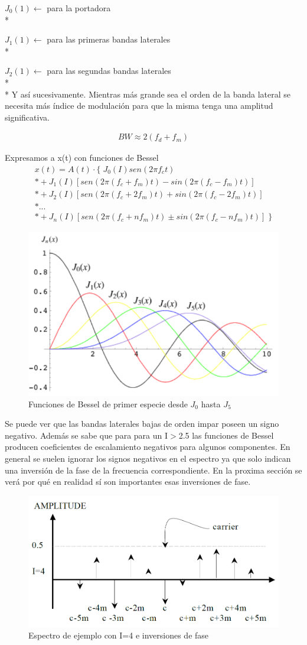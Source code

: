 \documentclass[assd_tp2_main.tex]{subfiles}
\begin{document}
$J_{0}(1)\longleftarrow$  para la portadora \\*

$J_{1}(1)\longleftarrow$  para las primeras bandas laterales \\*

$J_{2}(1)\longleftarrow$  para las segundas bandas laterales \\*
\\*
Y así sucesivamente.
Mientras más grande sea el orden de la banda lateral se necesita más índice de modulación para que la misma tenga una amplitud significativa.

\begin{eqnarray*}
\displaystyle BW \approx 2(f_d+f_m)
\end{eqnarray*}

Expresamos a x(t) con funciones de Bessel
\begin{eqnarray*}
\textstyle x(t)=A(t)\cdot \{ \; J_{0}(I)sen(2\pi f_c t) \\*
				+J_1(I)[sen(2\pi(f_c+f_m)t) - sin(2\pi(f_c-f_m)t)] \\*
				+J_2(I)[sen(2\pi(f_c+2f_m)t) + sin(2\pi(f_c-2f_m)t)] \\*
				... \\*
				+J_n(I)[sen(2\pi(f_c+n f_m)t) \pm sin(2\pi(f_c-n f_m)t)] \; \}
\end{eqnarray*}

\begin{figure}[H]
\centering
\includegraphics[width=0.4\linewidth]{graficos/EJ4/Bessel.png}
\caption{Funciones de Bessel de primer especie desde $J_0$ hasta $J_5$ }
\label{fig:Bessel}
\end{figure}

Se puede ver que las bandas laterales bajas de orden impar poseen un signo negativo. Además se sabe que para para un I$>$2.5
las funciones de Bessel producen coeficientes de escalamiento negativos para algunos componentes.
En general se suelen ignorar los signos negativos en el espectro ya que solo indican una inversión de la fase de la frecuencia correspondiente. En la proxima sección se verá por qué en realidad sí son importantes esas inversiones de fase.
\begin{figure}[H]
\centering
\includegraphics[width=0.4\linewidth]{graficos/EJ4/signos.png}
\caption{Espectro de ejemplo con I=4 e inversiones de fase}
\label{fig:signos}
\end{figure}
\end{document}
